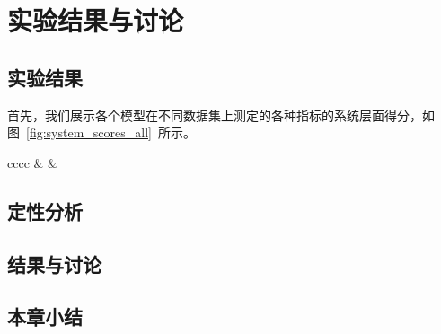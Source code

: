 \usepackage{graphicx}


\chapter{实验结果与讨论}\label{ch:experiment}

\section{实验结果}\label{sec:experiment_result}
首先，我们展示各个模型在不同数据集上测定的各种指标的系统层面得分，如图~\ref{fig:system_scores_all}~所示。

\begin{table}
    \centering
    \caption{}
    \label{}
    \begin{tabular}{cccc}
        \hline
        &  & 

    \end{tabular}
\end{table}

\section{定性分析}\label{sec:qualitative_analysis}

\section{结果与讨论}\label{sec:result_and_discussion}

\section{本章小结}\label{sec:experiment_conclusion}
